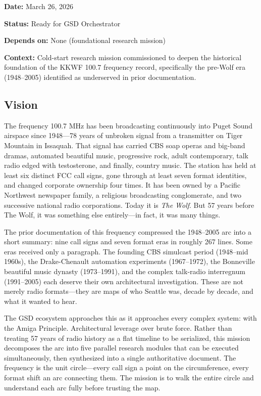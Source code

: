 \documentclass[11pt,letterpaper]{article}
\newcommand{\metafield}[2]{\textbf{\sffamily #1} #2\par}
\begin{document}
\metafield{Date:}{March 26, 2026}
\metafield{Status:}{Ready for GSD Orchestrator}
\metafield{Depends on:}{None (foundational research mission)}
\metafield{Context:}{Cold-start research mission commissioned to deepen the historical foundation of the KKWF 100.7 frequency record, specifically the pre-Wolf era (1948--2005) identified as underserved in prior documentation.}

\subsection{Vision}

The frequency 100.7 MHz has been broadcasting continuously into Puget Sound airspace since 1948---78 years of unbroken signal from a transmitter on Tiger Mountain in Issaquah. That signal has carried CBS soap operas and big-band dramas, automated beautiful music, progressive rock, adult contemporary, talk radio edged with testosterone, and finally, country music. The station has held at least six distinct FCC call signs, gone through at least seven format identities, and changed corporate ownership four times. It has been owned by a Pacific Northwest newspaper family, a religious broadcasting conglomerate, and two successive national radio corporations. Today it is \textit{The Wolf}. But 57 years before The Wolf, it was something else entirely---in fact, it was many things.

The prior documentation of this frequency compressed the 1948--2005 arc into a short summary: nine call signs and seven format eras in roughly 267 lines. Some eras received only a paragraph. The founding CBS simulcast period (1948--mid 1960s), the Drake-Chenault automation experiments (1967--1972), the Bonneville beautiful music dynasty (1973--1991), and the complex talk-radio interregnum (1991--2005) each deserve their own architectural investigation. These are not merely radio formats---they are maps of who Seattle was, decade by decade, and what it wanted to hear.

The GSD ecosystem approaches this as it approaches every complex system: with the Amiga Principle. Architectural leverage over brute force. Rather than treating 57 years of radio history as a flat timeline to be serialized, this mission decomposes the arc into five parallel research modules that can be executed simultaneously, then synthesized into a single authoritative document. The frequency is the unit circle---every call sign a point on the circumference, every format shift an arc connecting them. The mission is to walk the entire circle and understand each arc fully before trusting the map.
\end{document}
